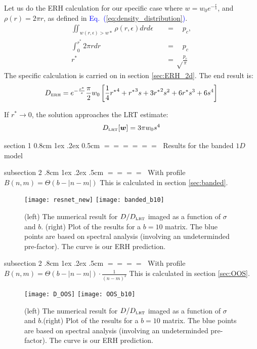 \documentclass[onecolumn,fleqn,notitlepage,secnumarabic]{revtex4}
\makeatletter
\newcommand{\tbox}[1]{\mbox{\tiny #1}}
\newcommand{\beq}{\begin{eqnarray}}
\newcommand{\eeq}{\end{eqnarray}}
\newcommand{\Eq}[1]{\textcolor{blue}{Eq.\!\!~(\ref{#1})}}
\def\section{%
  \@startsection
    {section}%
    {1}%
    {\z@}%
    {0.8cm \@plus1ex \@minus .2ex}%
    {0.5cm}%
    {\Large\bf $=\!=\!=\!=\!=\!=\;$}%
}%
\def\subsection{%
  \@startsection
    {subsection}%
    {2}%
    {\z@}%
    {.8cm \@plus1ex \@minus .2ex}%
    {.5cm}%
    {\normalfont\small\bfseries$=\!=\!=\!=\;$}%
}%
\makeatother
\begin{document}
Let us do the ERH calculation for our specific case 
where $w =w_0 e^{-\frac{r}{s}}$, and $\rho(r) = 2\pi r$,  
as defined in \Eq{eq:density_distribution}.
%
\begin{align}
\iint_{w(r,\epsilon)>w*} \rho(r,\epsilon)drd\epsilon \quad &= \quad p_c, \\
\int_0^{r^*} 2\pi r dr \quad &=\quad p_c \\
r^*  &= \sqrt\frac{p_c}{\pi}
\end{align}
%
The specific calculation is carried on in section \ref{sec:ERH_2d}. The end result is:
\begin{align}
D_{\tbox{ERH}} = e^{-\frac{r^*}{s}}\frac{\pi}{2} w_0\left[\frac{1}{4}{r^*}^4 +  {r^*}^3 s + 3{r^*}^2 s^2 + 6r^*s^3 +6 s^4  \right]
\end{align}

%
If $r^* \rightarrow 0$, the solution approaches the LRT estimate: 
%
\beq
D_{\tbox{LRT}}[\bm{w}] = 3\pi w_0 s^4 
\eeq

\section{Results for the banded $1D$ model}

\subsection{With profile $B(n,m) = \Theta (b-|n-m|)$}
This is calculated in section \ref{sec:banded}.
\begin{figure}[H]
\texttt{[image: resnet\_new]}
\texttt{[image: banded\_b10]}
\caption{(left) The numerical result for $D/D_{\tbox{LRT}}$ imaged as a function of $\sigma$ and $b$. (right) Plot of the results for a $b=10$ matrix. The blue points are based on spectral analysis (involving an undeterminded pre-factor). The curve is our ERH prediction.}
\end{figure}

\subsection{With profile $B(n,m) = \Theta(b-|n-m|)\cdot \frac{1}{(n-m)^2}$}
This is calculated in section \ref{sec:OOS}.
\begin{figure}[H]
\texttt{[image: D\_OOS]}
\texttt{[image: OOS\_b10]}
\caption{(left) The numerical result for $D/D_{\tbox{LRT}}$ imaged as a function of $\sigma$ and $b$.(right) Plot of the results for a $b=10$ matrix. The blue points are based on spectral analysis (involving an undeterminded pre-factor). The curve is our ERH prediction.}
\end{figure}
\end{document}
